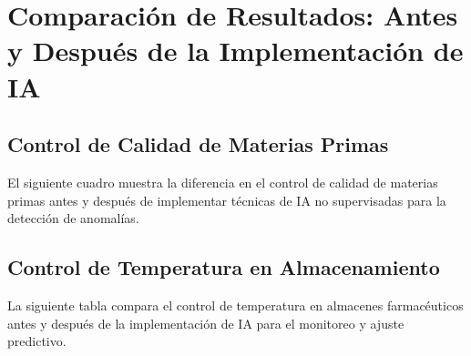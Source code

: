 \section{Comparación de Resultados: Antes y Después de la Implementación de IA}

\subsection{Control de Calidad de Materias Primas}

El siguiente cuadro muestra la diferencia en el control de calidad de materias primas antes y después de implementar técnicas de IA no supervisadas para la detección de anomalías.

\begin{table}[H]
\centering
\caption{Comparación de Control de Calidad de Materias Primas (Antes y Después de IA)}
\end{table}

\subsection{Control de Temperatura en Almacenamiento}

La siguiente tabla compara el control de temperatura en almacenes farmacéuticos antes y después de la implementación de IA para el monitoreo y ajuste predictivo.

